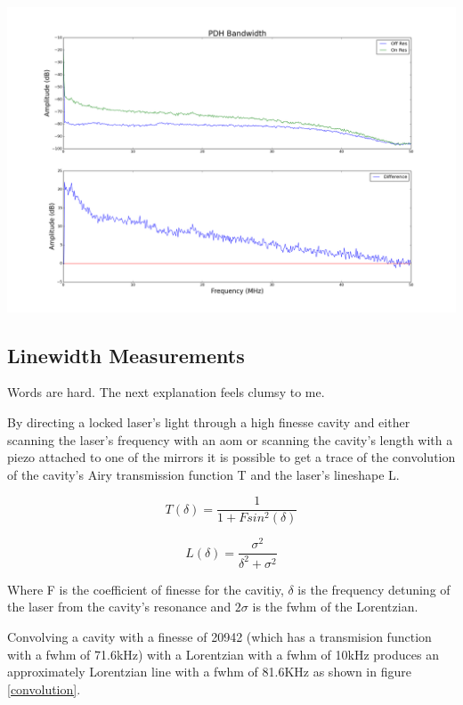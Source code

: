 \documentclass{article}
\newenvironment{Figure}
  {\par\medskip\noindent\minipage{\linewidth}}
  {\endminipage\par\medskip}
\begin{document}
\begin{multicols}{2}
\begin{Figure}
    \centering
    \captionsetup{type=figure}
    \includegraphics[width=\linewidth]{Figs/bandwidth_measurement.png}
    \label{bandwidth_measurement}
\end{Figure}


\subsection{Linewidth Measurements}

{\color{red}Words are hard. The next explanation feels clumsy to me.}

By directing a locked laser's light through a high finesse cavity and either scanning the laser's frequency with an \gls{aom} or scanning the cavity's length with a piezo attached to one of the mirrors it is possible to get a trace of the convolution of the cavity's Airy transmission function T and the laser's lineshape L.

\begin{equation}
T(\delta) = \frac{1}{1+F sin^2(\delta)}
\end{equation}

\begin{equation}
L(\delta) = \frac{\sigma^2}{\delta^2 + \sigma^2}
\end{equation}

Where F is the coefficient of finesse for the cavitiy, $\delta$ is the frequency detuning of the laser from the cavity's resonance and $2\sigma$ is the \gls{fwhm} of the Lorentzian.

Convolving a cavity with a finesse of 20942 (which has a transmision function with a \gls{fwhm} of 71.6kHz) with a Lorentzian with a \gls{fwhm} of 10kHz produces an approximately Lorentzian line with a \gls{fwhm} of 81.6KHz as shown in figure \ref{convolution}.


\end{multicols}
\end{document}
